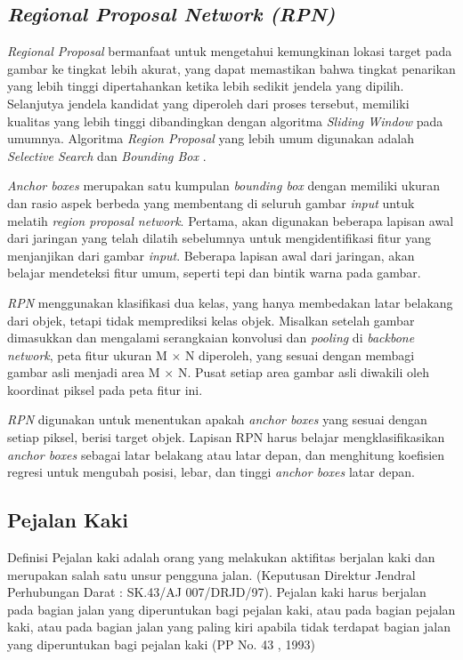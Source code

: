 \subsection{\textit{Regional Proposal Network (RPN)}}
\label{subsec:rpn}

\textit{Regional Proposal} bermanfaat untuk mengetahui kemungkinan lokasi target pada gambar ke tingkat lebih akurat, yang dapat memastikan bahwa tingkat penarikan yang lebih tinggi dipertahankan ketika lebih sedikit jendela yang dipilih. Selanjutya jendela kandidat yang diperoleh dari proses tersebut, memiliki kualitas yang lebih tinggi dibandingkan dengan algoritma \textit{Sliding Window} pada umumnya. Algoritma \textit{Region Proposal} yang lebih umum digunakan adalah \textit{Selective Search} dan \textit{Bounding Box} \citep{rpn}.

\textit{Anchor boxes} merupakan satu kumpulan \textit{bounding box} dengan memiliki ukuran dan rasio aspek berbeda yang membentang di seluruh gambar \textit{input} untuk melatih \textit{region proposal network}. Pertama, akan digunakan beberapa lapisan awal dari jaringan yang telah dilatih sebelumnya untuk mengidentifikasi fitur yang menjanjikan dari gambar \textit{input}. Beberapa lapisan awal dari jaringan, akan belajar mendeteksi fitur umum, seperti tepi dan bintik warna pada gambar.

\textit{RPN} menggunakan klasifikasi dua kelas, yang hanya membedakan latar belakang dari objek, tetapi tidak memprediksi kelas objek. Misalkan setelah gambar dimasukkan dan mengalami serangkaian konvolusi dan \textit{pooling} di \textit{backbone network}, peta fitur ukuran M $\times$ N diperoleh, yang sesuai dengan membagi gambar asli menjadi area M $\times$ N. Pusat setiap area gambar asli diwakili oleh koordinat piksel pada peta fitur ini. 

\textit{RPN} digunakan untuk menentukan apakah \textit{anchor boxes} yang sesuai dengan setiap piksel, berisi target objek. Lapisan RPN harus belajar mengklasifikasikan \textit{anchor boxes} sebagai latar belakang atau latar depan, dan menghitung koefisien regresi untuk mengubah posisi, lebar, dan tinggi \textit{anchor boxes} latar depan.

\subsection{Pejalan Kaki}
\label{subsec:pedestrian}

Definisi Pejalan kaki adalah orang yang melakukan aktifitas berjalan kaki dan merupakan salah satu unsur pengguna jalan. (Keputusan Direktur Jendral Perhubungan Darat : SK.43/AJ 007/DRJD/97). Pejalan kaki harus berjalan pada bagian jalan yang diperuntukan bagi pejalan kaki, atau pada bagian pejalan kaki, atau pada bagian jalan yang paling kiri apabila tidak terdapat bagian jalan yang diperuntukan bagi pejalan kaki (PP No. 43 , 1993)


